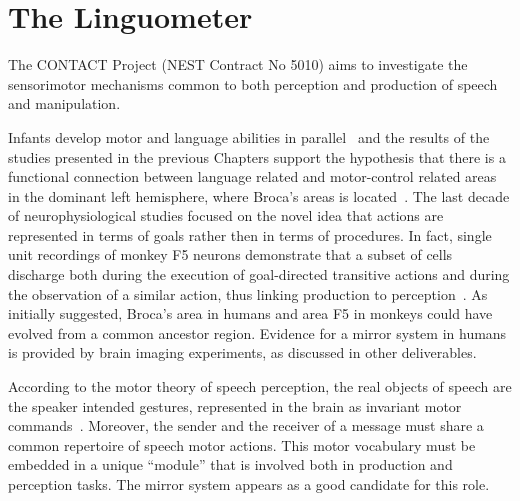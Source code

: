 \chapter{The Linguometer}
\label{ch:linguometer}
The CONTACT Project (NEST Contract No 5010) aims to investigate the
sensorimotor mechanisms common to both perception and production of speech and
manipulation.

Infants develop motor and language abilities in
parallel~\citep{lennenberg:1967,kandel.schwartz.jessel:2000} 
and the results of the studies presented in the previous Chapters support the
hypothesis that there is a functional connection between language related and
motor-control related areas in the dominant left
hemisphere, where Broca's areas is located~\citep{fadiga.etal:PRESS}. 
The last decade of neurophysiological studies focused on the novel idea that
actions are represented in terms of goals rather then in terms of
procedures.
In fact, single unit recordings of monkey F5 neurons demonstrate that a subset
of cells discharge both during the execution of goal-directed transitive 
actions and during the observation of a similar action, thus linking production
to perception~\citep{rizzolatti.etal:1996}.
As~\citet{rizzolatti.arbib:1998} initially suggested, Broca's area in humans 
and area F5 in monkeys could have evolved from a common ancestor region.
Evidence for a mirror system in humans is provided by brain imaging 
experiments, as discussed in other deliverables.

According to the motor theory of speech perception, the real objects of speech
are the speaker intended gestures, represented in the brain as invariant motor 
commands~\citep{liberman.mattingly:1985}.
Moreover, the sender and the receiver of a message must share a common
repertoire of speech motor actions. 
This motor vocabulary must be embedded in a unique ``module'' that is involved
both in production and perception tasks.
The mirror system appears as a good candidate for this role.

